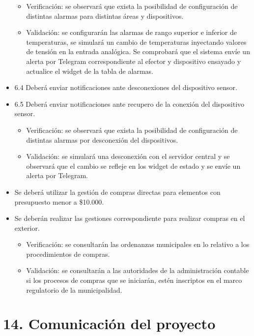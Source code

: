 \documentclass[11pt]{charter}
\begin{document}
\begin{itemize}
\begin{itemize}
\item Verificación: se observará que exista la posibilidad de configuración de distintas alarmas para distintas áreas y dispositivos.
\item Validación: se configurarán las alarmas de rango superior e inferior de temperaturas, se simulará un cambio de temperaturas inyectando valores de tensión en la entrada analógica. Se comprobará que el sistema envíe un alerta por Telegram correspondiente al efector y dispositivo ensayado y actualice el widget de la tabla de alarmas. 
\end{itemize}

\item 6.4 Deberá enviar notificaciones ante desconexiones del dispositivo sensor.
\item 6.5 Deberá enviar notificaciones ante recupero de la conexión del dispositivo sensor. 
\begin{itemize}
\item Verificación: se observará que exista la posibilidad de configuración de distintas alarmas por desconexión del dispositivos.
\item Validación: se simulará una desconexión con el servidor central y se observará que el cambio se refleje en los widget de estado y se envíe un alerta por Telegram.
\end{itemize}
 
\item Se deberá utilizar la gestión de compras directas para elementos con presupuesto menor a {\$10.000}.
\item Se deberán realizar las gestiones correspondiente para realizar compras en el exterior.

\begin{itemize}
\item Verificación: se consultarán las ordenanzas municipales en lo relativo a los procedimientos de compras.
\item Validación: se consultarán a las autoridades de la administración contable si los procesos de compras que se iniciarán, estén inscriptos en el marco regulatorio de la municipalidad.
\end{itemize}


\end{itemize}

\section{14. Comunicación del proyecto}
\label{sec:comunicaciones}
\end{document}
